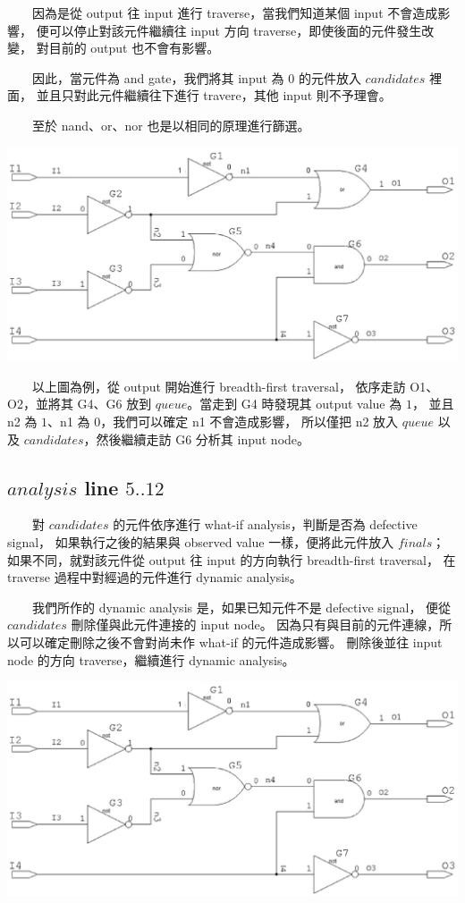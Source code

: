 \documentclass[12pt,a4paper]{article}
\begin{document}
　　因為是從 output 往 input 進行 traverse，當我們知道某個 input 不會造成影響，%
便可以停止對該元件繼續往 input 方向 traverse，即使後面的元件發生改變，%
對目前的 output 也不會有影響。

　　因此，當元件為 and gate，我們將其 input 為 $0$ 的元件放入 $candidates$ 裡面，%
並且只對此元件繼續往下進行 travere，其他 input 則不予理會。

　　至於 nand、or、nor 也是以相同的原理進行篩選。

\begin{center}
\includegraphics[scale=0.6]{imgs/04.eps}
\end{center}

　　以上圖為例，從 output 開始進行 breadth-first traversal，%
依序走訪 O1、O2，並將其 G4、G6 放到 $queue$。當走到 G4 時發現其 output value 為 $1$，%
並且 n2 為 $1$、n1 為 $0$，我們可以確定 n1 不會造成影響，%
所以僅把 n2 放入 $queue$ 以及 $candidates$，然後繼續走訪 G6 分析其 input node。

\subsection{$analysis$ line $5..12$}

　　對 $candidates$ 的元件依序進行 what-if analysis，判斷是否為 defective signal，%
如果執行之後的結果與 observed value 一樣，便將此元件放入 $finals$；%
如果不同，就對該元件從 output 往 input 的方向執行 breadth-first traversal，%
在 traverse 過程中對經過的元件進行 dynamic analysis。

　　我們所作的 dynamic analysis 是，如果已知元件不是 defective signal，%
便從 $candidates$ 刪除僅與此元件連接的 input node。%
因為只有與目前的元件連線，所以可以確定刪除之後不會對尚未作 what-if 的元件造成影響。%
刪除後並往 input node 的方向 traverse，繼續進行 dynamic analysis。

\begin{center}
\includegraphics[scale=0.6]{imgs/04.eps}
\end{center}
\end{document}
